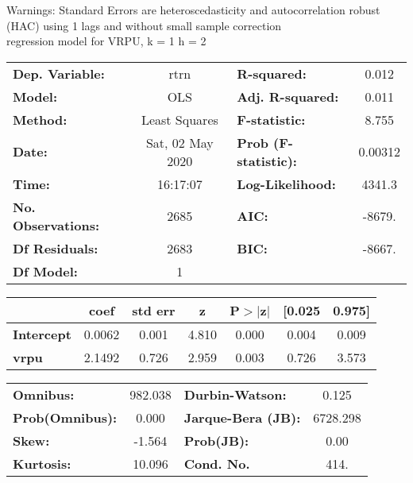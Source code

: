 Warnings: \newline
 [1] Standard Errors are heteroscedasticity and autocorrelation robust (HAC) using 1 lags and without small sample correction\\ 

regression model for VRPU, k = 1 h = 2\begin{center}
\begin{tabular}{lclc}
\toprule
\textbf{Dep. Variable:}    &       rtrn       & \textbf{  R-squared:         } &     0.012   \\
\textbf{Model:}            &       OLS        & \textbf{  Adj. R-squared:    } &     0.011   \\
\textbf{Method:}           &  Least Squares   & \textbf{  F-statistic:       } &     8.755   \\
\textbf{Date:}             & Sat, 02 May 2020 & \textbf{  Prob (F-statistic):} &  0.00312    \\
\textbf{Time:}             &     16:17:07     & \textbf{  Log-Likelihood:    } &    4341.3   \\
\textbf{No. Observations:} &        2685      & \textbf{  AIC:               } &    -8679.   \\
\textbf{Df Residuals:}     &        2683      & \textbf{  BIC:               } &    -8667.   \\
\textbf{Df Model:}         &           1      & \textbf{                     } &             \\
\bottomrule
\end{tabular}
\begin{tabular}{lcccccc}
                   & \textbf{coef} & \textbf{std err} & \textbf{z} & \textbf{P$> |$z$|$} & \textbf{[0.025} & \textbf{0.975]}  \\
\midrule
\textbf{Intercept} &       0.0062  &        0.001     &     4.810  &         0.000        &        0.004    &        0.009     \\
\textbf{vrpu}      &       2.1492  &        0.726     &     2.959  &         0.003        &        0.726    &        3.573     \\
\bottomrule
\end{tabular}
\begin{tabular}{lclc}
\textbf{Omnibus:}       & 982.038 & \textbf{  Durbin-Watson:     } &    0.125  \\
\textbf{Prob(Omnibus):} &   0.000 & \textbf{  Jarque-Bera (JB):  } & 6728.298  \\
\textbf{Skew:}          &  -1.564 & \textbf{  Prob(JB):          } &     0.00  \\
\textbf{Kurtosis:}      &  10.096 & \textbf{  Cond. No.          } &     414.  \\
\bottomrule
\end{tabular}
\end{center}

